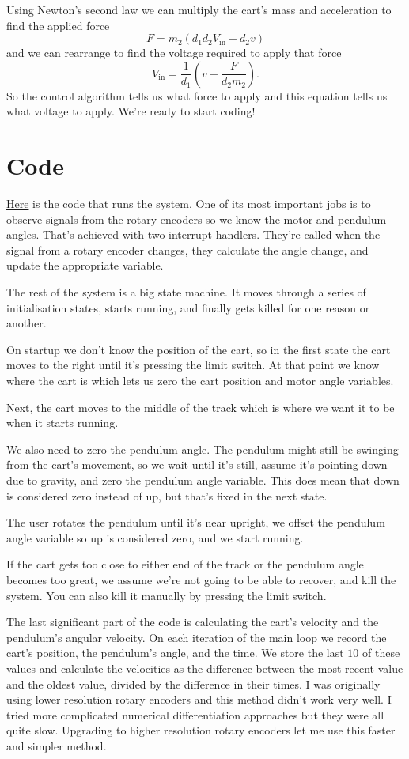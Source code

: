 \documentclass{article}
\begin{document}
Using Newton's second law we can multiply the cart's mass and acceleration to find the applied force \[F = m_2 (d_1 d_2 V_\text{in} - d_2 v)\] and we can rearrange to find the voltage required to apply that force \[V_\text{in} = \frac{1}{d_1} \left( v + \frac{F}{d_2 m_2} \right).\] So the control algorithm tells us what force to apply and this equation tells us what voltage to apply. We're ready to start coding!

\section{Code}

\href{https://github.com/chrisdoble/self-balancing-inverted-pendulum/blob/master/sketch/sketch.ino}{Here} is the code that runs the system. One of its most important jobs is to observe signals from the rotary encoders so we know the motor and pendulum angles. That's achieved with two interrupt handlers. They're called when the signal from a rotary encoder changes, they calculate the angle change, and update the appropriate variable.

The rest of the system is a big state machine. It moves through a series of initialisation states, starts running, and finally gets killed for one reason or another.

On startup we don't know the position of the cart, so in the first state the cart moves to the right until it's pressing the limit switch. At that point we know where the cart is which lets us zero the cart position and motor angle variables.

Next, the cart moves to the middle of the track which is where we want it to be when it starts running.

We also need to zero the pendulum angle. The pendulum might still be swinging from the cart's movement, so we wait until it's still, assume it's pointing down due to gravity, and zero the pendulum angle variable. This does mean that down is considered zero instead of up, but that's fixed in the next state.

The user rotates the pendulum until it's near upright, we offset the pendulum angle variable so up is considered zero, and we start running.

If the cart gets too close to either end of the track or the pendulum angle becomes too great, we assume we're not going to be able to recover, and kill the system. You can also kill it manually by pressing the limit switch.

The last significant part of the code is calculating the cart's velocity and the pendulum's angular velocity. On each iteration of the main loop we record the cart's position, the pendulum's angle, and the time. We store the last $10$ of these values and calculate the velocities as the difference between the most recent value and the oldest value, divided by the difference in their times. I was originally using lower resolution rotary encoders and this method didn't work very well. I tried more complicated numerical differentiation approaches but they were all quite slow. Upgrading to higher resolution rotary encoders let me use this faster and simpler method.
\end{document}

